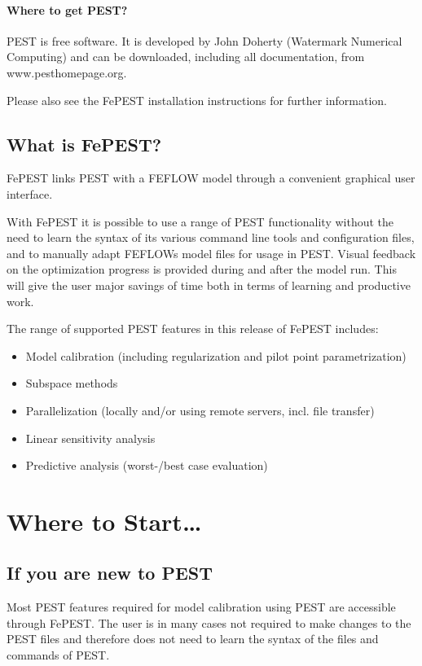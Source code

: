 \paragraph{Where to get PEST?}

PEST is free software. It is developed by John Doherty (Watermark Numerical Computing) and can be downloaded, including all documentation, from www.pesthomepage.org.

Please also see the FePEST installation instructions for further information.

\subsection{What is FePEST?}

FePEST links PEST with a FEFLOW model through a convenient graphical user interface.

With FePEST it is possible to use a range of PEST functionality without the need to learn the syntax of its various command line tools and configuration files, and to manually adapt FEFLOWs model files for usage in PEST. Visual feedback on the optimization progress is provided during and after the model run. This will give the user major savings of time both in terms of learning and productive work.

The range of supported PEST features in this release of FePEST includes:
\begin{itemize}
\item Model calibration (including regularization and pilot point parametrization)
\item Subspace methods
\item Parallelization (locally and/or using remote servers, incl. file transfer)
\item Linear sensitivity analysis
\item Predictive analysis (worst-/best case evaluation)
\end{itemize}

\section{Where to Start…}

\subsection{If you are new to PEST}

Most PEST features required for model calibration using PEST are accessible through FePEST. The user is in many cases not required to make changes to the PEST files and therefore does not need to learn the syntax of the files and commands of PEST.


